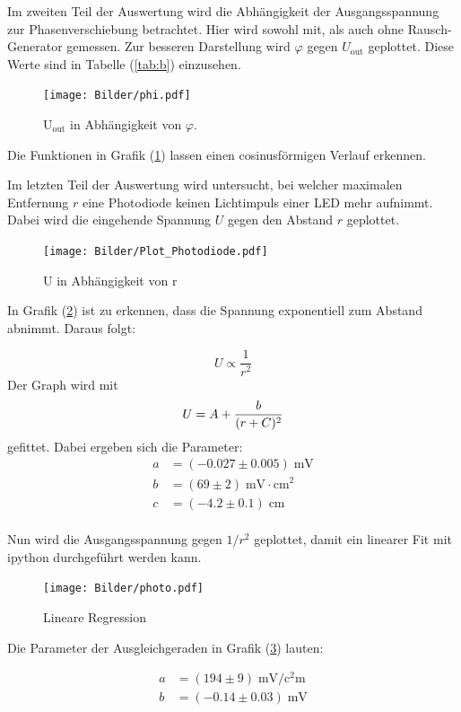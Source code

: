 \newpage

Im zweiten Teil der Auswertung wird die Abhängigkeit der Ausgangsspannung zur Phasenverschiebung
betrachtet. Hier wird sowohl mit, als auch ohne Rausch-Generator gemessen. Zur besseren
Darstellung wird $\varphi$ gegen $U_\text{out}$ geplottet. Diese Werte sind in Tabelle (\ref{tab:b}) einzusehen.

\begin{figure}[H]
  \centering
  \texttt{[image: Bilder/phi.pdf]}
  \caption{U$_\text{out}$ in Abhängigkeit von $\varphi$.}
  \label{fig:Uout}
\end{figure}

Die Funktionen in Grafik (\ref{fig:Uout}) lassen einen cosinusförmigen Verlauf erkennen. \\

\newpage


Im letzten Teil der Auswertung wird untersucht, bei welcher maximalen Entfernung $r$
eine Photodiode keinen Lichtimpuls einer LED mehr aufnimmt. Dabei wird die eingehende Spannung $U$
gegen den Abstand $r$ geplottet.
\begin{figure}[H]
  \centering
  \texttt{[image: Bilder/Plot\_Photodiode.pdf]}
  \caption{U in Abhängigkeit von r}
  \label{fig:led}
\end{figure}

In Grafik (\ref{fig:led}) ist zu erkennen, dass die Spannung exponentiell zum Abstand
abnimmt. Daraus folgt:

\begin{equation*}
  U \propto \frac{1}{r^2}
\end{equation*}
Der Graph wird mit
\begin{equation}
U = A + \frac{b}{(r+C)^2} \notag
\end{equation}
gefittet.
Dabei ergeben sich die Parameter:
\begin{align*}
  a &= (-0.027 ± 0.005) \; \si{\milli\volt} \\
  b &= (69 ± 2)    \;   \si{\milli\volt\cdot\centi\square\meter}        \\
  c &= (-4.2 ± 0.1) \; \si{\centi\meter}
\end{align*}
\\
Nun wird die Ausgangsspannung gegen $1/r^2$ geplottet, damit ein linearer Fit mit ipython durchgeführt
werden kann.

\begin{figure}[!h]
\centering
\texttt{[image: Bilder/photo.pdf]}
\caption{Lineare Regression}
\label{fig:lin}
\end{figure}

Die Parameter der Ausgleichgeraden in Grafik (\ref{fig:lin}) lauten:

\begin{align*}
    a &= (194 ± 9) \; \si{\milli\volt\per\square\centi\meter} \\
    b &= (-0.14 ± 0.03) \; \si{\milli\volt}
\end{align*}
